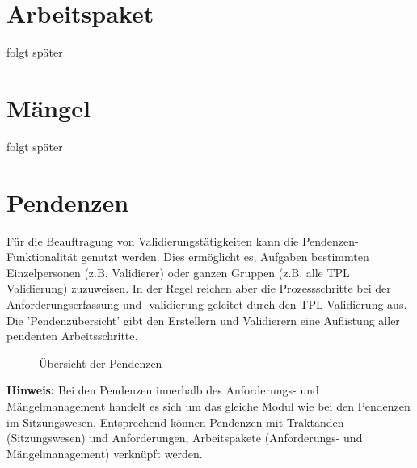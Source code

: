 

\pagebreak

\section{Arbeitspaket}

folgt später

\section{Mängel}

folgt später

\section{Pendenzen}

Für die Beauftragung von Validierungstätigkeiten kann die Pendenzen-Funktionalität genutzt werden. Dies ermöglicht es, Aufgaben bestimmten Einzelpersonen (z.B. Validierer) oder ganzen Gruppen (z.B. alle TPL Validierung) zuzuweisen. In der Regel reichen aber die Prozessschritte bei der Anforderungserfassung und -validierung geleitet durch den TPL Validierung aus. Die 'Pendenzübersicht' gibt den Erstellern und Validierern eine Auflistung aller pendenten Arbeitsschritte. 

\begin{figure}[H]
\caption{Übersicht der Pendenzen}
\end{figure}

\textbf{Hinweis:} Bei den Pendenzen innerhalb des Anforderungs- und Mängelmanagement handelt es sich um das gleiche Modul wie bei den Pendenzen im Sitzungswesen. Entsprechend können Pendenzen mit Traktanden (Sitzungswesen) und Anforderungen, Arbeitspakete (Anforderungs- und Mängelmanagement) verknüpft werden.







